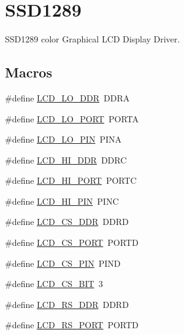 \hypertarget{group___s_s_d1289}{}\section{S\+S\+D1289}
\label{group___s_s_d1289}


S\+S\+D1289 color Graphical L\+C\+D Display Driver.  


\subsection*{Macros}
\begin{DoxyCompactItemize}
\item 
\#define \hyperlink{group___s_s_d1289_ga80fe94799cc97d53850ad19fbc65040c}{L\+C\+D\+\_\+\+L\+O\+\_\+\+D\+D\+R}~D\+D\+R\+A
\item 
\#define \hyperlink{group___s_s_d1289_ga732d0a6d1e03ae0c4e01aa46a1566b69}{L\+C\+D\+\_\+\+L\+O\+\_\+\+P\+O\+R\+T}~P\+O\+R\+T\+A
\item 
\#define \hyperlink{group___s_s_d1289_ga667e166d29800b8c1c1f2a80440025b7}{L\+C\+D\+\_\+\+L\+O\+\_\+\+P\+I\+N}~P\+I\+N\+A
\item 
\#define \hyperlink{group___s_s_d1289_gac14ed383a75e6c8289304feda77724c8}{L\+C\+D\+\_\+\+H\+I\+\_\+\+D\+D\+R}~D\+D\+R\+C
\item 
\#define \hyperlink{group___s_s_d1289_ga3aa31ee91966a5fdc3048f9349cf05d5}{L\+C\+D\+\_\+\+H\+I\+\_\+\+P\+O\+R\+T}~P\+O\+R\+T\+C
\item 
\#define \hyperlink{group___s_s_d1289_ga92296ab5dc25ebb81e697ff1af769a2d}{L\+C\+D\+\_\+\+H\+I\+\_\+\+P\+I\+N}~P\+I\+N\+C
\item 
\#define \hyperlink{group___s_s_d1289_ga2be6e09a7508bf23c288bfa9c8970ad4}{L\+C\+D\+\_\+\+C\+S\+\_\+\+D\+D\+R}~D\+D\+R\+D
\item 
\#define \hyperlink{group___s_s_d1289_ga786e250780c1500731386381212e5dbb}{L\+C\+D\+\_\+\+C\+S\+\_\+\+P\+O\+R\+T}~P\+O\+R\+T\+D
\item 
\#define \hyperlink{group___s_s_d1289_ga50d72083b1ed4dd0bc2eaabb4a0332c8}{L\+C\+D\+\_\+\+C\+S\+\_\+\+P\+I\+N}~P\+I\+N\+D
\item 
\#define \hyperlink{group___s_s_d1289_gae74dd9ee1a6476a863ff736596c07be2}{L\+C\+D\+\_\+\+C\+S\+\_\+\+B\+I\+T}~3
\item 
\#define \hyperlink{group___s_s_d1289_ga1de29b032973d1a75c57a814b064b0d9}{L\+C\+D\+\_\+\+R\+S\+\_\+\+D\+D\+R}~D\+D\+R\+D
\item 
\#define \hyperlink{group___s_s_d1289_gac5be2a22727fd9ca349e1c9bcbfbcd47}{L\+C\+D\+\_\+\+R\+S\+\_\+\+P\+O\+R\+T}~P\+O\+R\+T\+D

\end{DoxyCompactItemize}
